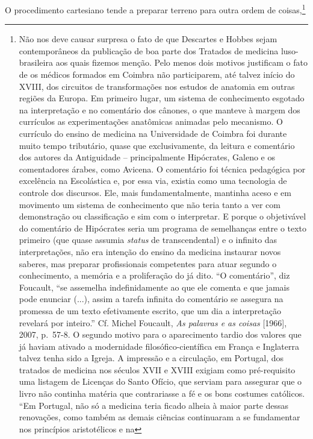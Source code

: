 O procedimento cartesiano tende a preparar terreno para outra ordem de
coisas,\footnote{Não nos deve causar surpresa o fato de que Descartes e
  Hobbes sejam contemporâneos da publicação de boa parte dos Tratados de
  medicina luso-brasileira aos quais fizemos menção. Pelo menos dois
  motivos justificam o fato de os médicos formados em Coimbra não
  participarem, até talvez início do XVIII, dos circuitos de
  transformações nos estudos de anatomia em outras regiões da Europa. Em
  primeiro lugar, um sistema de conhecimento esgotado na interpretação e
  no comentário dos cânones, o que manteve à margem dos currículos as
  experimentações anatômicas animadas pelo mecanismo. O currículo do
  ensino de medicina na Universidade de Coimbra foi durante muito tempo
  tributário, quase que exclusivamente, da leitura e comentário dos
  autores da Antiguidade -- principalmente Hipócrates, Galeno e os
  comentadores árabes, como Avicena. O comentário foi técnica pedagógica
  por excelência na Escolástica e, por essa via, existia como uma
  tecnologia de controle dos discursos. Ele, mais fundamentalmente,
  mantinha aceso e em movimento um sistema de conhecimento que não teria
  tanto a ver com demonstração ou classificação e sim com o interpretar.
  E porque o objetivável do comentário de Hipócrates seria um programa
  de semelhanças entre o texto primeiro (que quase assumia \emph{status}
  de transcendental) e o infinito das interpretações, não era intenção
  do ensino da medicina instaurar novos saberes, mas preparar
  profissionais competentes para atuar segundo o conhecimento, a memória
  e a proliferação do já dito. ``O comentário'', diz Foucault, ``se
  assemelha indefinidamente ao que ele comenta e que jamais pode
  enunciar (...), assim a tarefa infinita do comentário se assegura na
  promessa de um texto efetivamente escrito, que um dia a interpretação
  revelará por inteiro.'' Cf. Michel Foucault, \emph{As palavras e as
  coisas} {[}1966{]}, 2007, p.~57-8. O segundo motivo para o
  aparecimento tardio dos valores que já haviam ativado a modernidade
  filosófico-científica em França e Inglaterra talvez tenha sido a
  Igreja. A impressão e a circulação, em Portugal, dos tratados de
  medicina nos séculos XVII e XVIII exigiam como pré-requisito uma
  listagem de Licenças do Santo Ofício, que serviam para assegurar que o
  livro não continha matéria que contrariasse a fé e os bons costumes
  católicos. ``Em Portugal, não só a medicina teria ficado alheia à
  maior parte dessas renovações, como também as demais ciências
  continuaram a se fundamentar nos princípios aristotélicos e na
}
